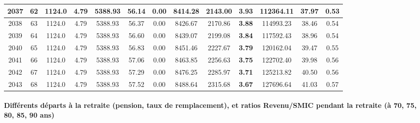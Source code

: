 {\begin{center}
\begin{tabular}[htb]{|c|c||c|c|c|c|c|c||c|c||c|c|c||}
\hline 
 2037 &  62 &  1124.0 &  4.79 &  5388.93 &  56.14 &  0.00 &  8414.28 &  2143.00 &  {\bf 3.93} &  112364.11 &  37.97 &  0.53 \\ 
\hline 
 2038 &  63 &  1124.0 &  4.79 &  5388.93 &  56.37 &  0.00 &  8426.67 &  2170.86 &  {\bf 3.88} &  114993.23 &  38.46 &  0.54 \\ 
\hline 
 2039 &  64 &  1124.0 &  4.79 &  5388.93 &  56.60 &  0.00 &  8439.07 &  2199.08 &  {\bf 3.84} &  117592.43 &  38.96 &  0.54 \\ 
\hline 
 2040 &  65 &  1124.0 &  4.79 &  5388.93 &  56.83 &  0.00 &  8451.46 &  2227.67 &  {\bf 3.79} &  120162.04 &  39.47 &  0.55 \\ 
\hline 
 2041 &  66 &  1124.0 &  4.79 &  5388.93 &  57.06 &  0.00 &  8463.85 &  2256.63 &  {\bf 3.75} &  122702.40 &  39.98 &  0.56 \\ 
\hline 
 2042 &  67 &  1124.0 &  4.79 &  5388.93 &  57.29 &  0.00 &  8476.25 &  2285.97 &  {\bf 3.71} &  125213.82 &  40.50 &  0.56 \\ 
\hline 
 2043 &  68 &  1124.0 &  4.79 &  5388.93 &  57.52 &  0.00 &  8488.64 &  2315.68 &  {\bf 3.67} &  127696.64 &  41.03 &  0.57 \\ 
\hline 
\hline 
\end{tabular} 
\end{center} } 
\newpage 
 
\paragraph{Différents départs à la retraite (pension, taux de remplacement), et ratios Revenu/SMIC pendant la retraite (à 70, 75, 80, 85, 90 ans)} 

